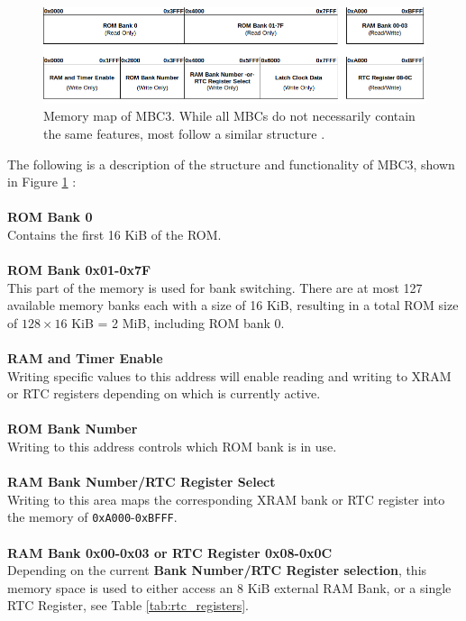 \begin{figure}[H]
    \centering
    \includegraphics[scale=0.5]{figures/MMU/MBC3_figure_no_padding.png}
    \caption{Memory map of MBC3. While all MBCs do not necessarily contain the same features, most follow a similar structure \cite{GBWikiMBC}.}
    \label{fig:MBC3}
\end{figure}

The following is a description of the structure and functionality of MBC3, shown in Figure \ref{fig:MBC3} \cite{GBWikiMBC}:
\\\\
\textbf{ROM Bank 0 }
\\
Contains the first 16 KiB of the ROM.
\\\\
\textbf{ROM Bank 0x01-0x7F}
\\
This part of the memory is used for bank switching. There are at most 127 available memory banks each with a size of 16 KiB, resulting in a total ROM size of $128 \times 16$ KiB = 2 MiB, including ROM bank 0.
\\\\
\textbf{RAM and Timer Enable}
\\
Writing specific values to this address will enable reading and writing to XRAM or RTC registers depending on which is currently active.
\\\\
\textbf{ROM Bank Number}
\\
Writing to this address controls which ROM bank is in use.
\\\\
\textbf{RAM Bank Number/RTC Register Select}
\\
Writing to this area maps the corresponding XRAM bank or RTC register into the memory of \texttt{0xA000}-\texttt{0xBFFF}. 
\\\\
\textbf{RAM Bank 0x00-0x03 or RTC Register 0x08-0x0C}
\\
Depending on the current \textbf{Bank Number/RTC Register selection}, this memory space is used to either access an 8 KiB external RAM Bank, or a single RTC Register, see Table \ref{tab:rtc_registers}.
